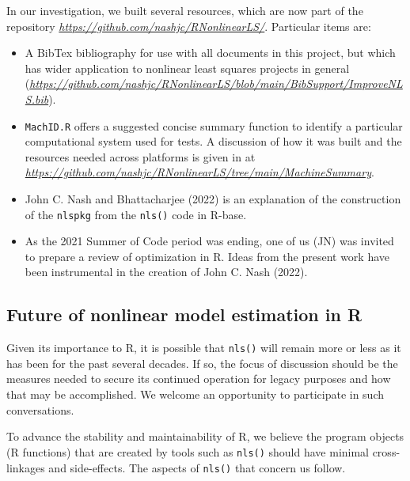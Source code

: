 In our investigation, we built several resources, which are now part of
the repository \emph{\url{https://github.com/nashjc/RNonlinearLS/}}. Particular items
are:

\begin{itemize}
\item
  A BibTex bibliography for use with all documents in this project, but which
  has wider application to nonlinear least squares projects in general
  (\emph{\url{https://github.com/nashjc/RNonlinearLS/blob/main/BibSupport/ImproveNLS.bib}}).
\item
  \texttt{MachID.R} offers a suggested concise summary function
  to identify a particular computational system used for tests. A discussion
  of how it was built and the resources needed across platforms is given in
  at \emph{\url{https://github.com/nashjc/RNonlinearLS/tree/main/MachineSummary}}.
\item
  John C. Nash and Bhattacharjee (2022) is an explanation of the construction of the \texttt{nlspkg} from the
  \texttt{nls()} code in R-base.
\item
  As the 2021 Summer of Code period was ending, one of us (JN) was invited to prepare
  a review of optimization in R. Ideas from the present work have been instrumental
  in the creation of John C. Nash (2022).
\end{itemize}

\subsection{Future of nonlinear model estimation in R}\label{future-of-nonlinear-model-estimation-in-r}

Given its importance to R, it is possible that \texttt{nls()} will remain more or less
as it has been for the past several decades. If so, the focus of discussion
should be the measures needed to secure its continued operation for legacy
purposes and how that may be accomplished.
We welcome an opportunity to participate in such conversations.

To advance the stability and maintainability of R, we believe the program
objects (R functions)
that are created by tools such as \texttt{nls()} should have minimal
cross-linkages and side-effects.
The aspects of \texttt{nls()} that concern us follow.

